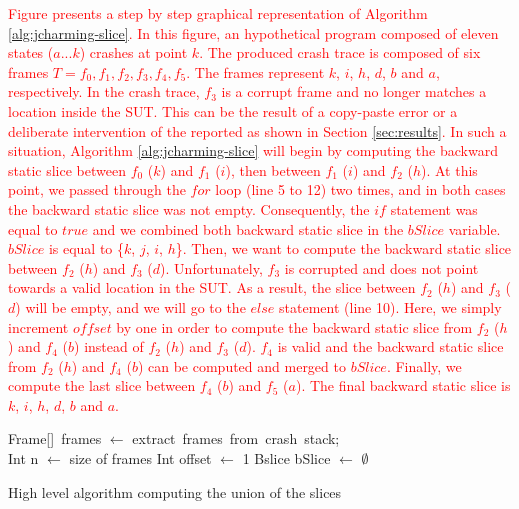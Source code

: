 \documentclass[times, doublespace]{smrauth}
\newcommand{\red}[1]{\textcolor{red}{#1}}
\begin{document}
{\red{Figure \label{fig:jcharming-algo} presents a step by step graphical representation of Algorithm \ref{alg:jcharming-slice}.
In this figure, an hypothetical program composed of eleven states ($a...k$) crashes at point $k$.
The produced crash trace is composed of six frames $T={f_0, f_1, f_2, f_3, f_4, f_5}$.
The frames represent $k$, $i$, $h$, $d$, $b$ and $a$, respectively.
In the crash trace, $f_3$ is a corrupt frame and no longer matches a location inside the SUT. This can be the result of a copy-paste error or a deliberate intervention of the reported as shown in Section \ref{sec:results}.
In such a situation, Algorithm \ref{alg:jcharming-slice} will begin by computing the backward static slice between $f_0$ ($k$) and $f_1$ ($i$), then between  $f_1$ ($i$) and $f_2$ ($h$).
At this point, we passed through the $for$ loop (line 5 to 12) two times, and in both cases the backward static slice was not empty.
Consequently, the $if$ statement was equal to $true$ and we combined both backward static slice in the $bSlice$ variable.
$bSlice$ is equal to \{$k$, $j$, $i$, $h$\}.
Then, we want to compute the backward static slice between $f_2$ ($h$) and $f_3$ ($d$).
Unfortunately, $f_3$ is corrupted and does not point towards a valid location in the SUT.
As a result, the slice between $f_2$ ($h$) and $f_3$ ($d$) will be empty, and we will go to the $else$ statement (line 10).
Here, we simply increment $offset$ by one in order to compute the backward static slice from $f_2$ ($h$) and $f_4$ ($b$) instead of $f_2$ ($h$) and $f_3$ ($d$).
$f_4$ is valid and the backward static slice from $f_2$ ($h$) and $f_4$ ($b$) can be computed and merged to $bSlice$.
Finally, we compute the last slice between $f_4$ ($b$) and $f_5$ ($a$).
The final backward static slice is $k$, $i$, $h$, $d$, $b$ and $a$.}

\vspace*{0.3cm}

\begin{algorithm}
 Frame[]~frames $\leftarrow$ extract~frames~from~crash~stack; \\
 Int n $\leftarrow$ size of frames\;
 Int offset $\leftarrow$ 1\;
 Bslice bSlice $\leftarrow$ $\emptyset$\;
\caption{High level algorithm computing the union of the slices\label{alg:jcharming-slice}}
\end{algorithm}

}
\end{document}
